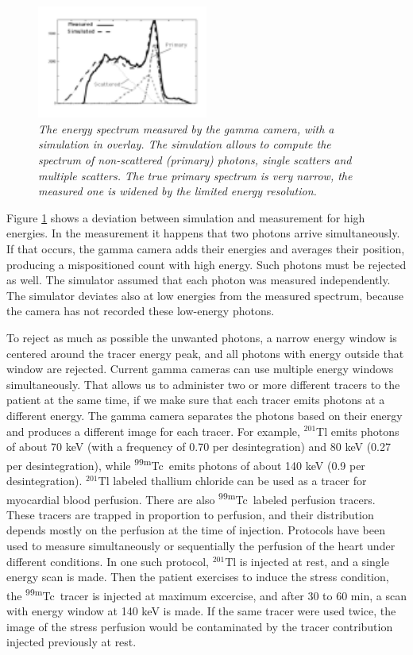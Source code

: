 \documentclass[11pt,oneside]{article}
\begin{document}
\begin{figure}[tb]
\centering
\includegraphics[width=0.5\textwidth]{figs/fig_scatter_spectrum.pdf}
\caption{\label{fig:scatter_spectrum} \emph{The energy spectrum measured by
the gamma camera, with a simulation in overlay. The simulation allows to
compute the spectrum of non-scattered (primary) photons, single scatters and
multiple scatters. The true primary spectrum is very narrow, the measured one
is widened by the limited energy resolution.}}
\end{figure}

Figure \ref{fig:scatter_spectrum} shows a deviation between simulation and
measurement for high energies. In the measurement it happens that two photons
arrive simultaneously. If that occurs, the gamma camera adds their energies
and averages their position, producing a mispositioned count with high
energy. Such photons must be rejected as well. The simulator assumed
that each photon was measured independently. The simulator deviates also at
low energies from the measured spectrum, because the camera has not recorded
these low-energy photons.

To reject as much as possible the unwanted photons, a narrow energy
window is centered around the tracer energy peak, and all photons with
energy outside that window are rejected. Current gamma cameras can use
multiple energy windows simultaneously. That allows us to administer
two or more different tracers to the patient at the same time, if we
make sure that each tracer emits photons at a different energy. The
gamma camera separates the photons based on their energy and produces
a different image for each tracer. For example, $^{201}$Tl emits
photons of about 70 keV (with a frequency of 0.70 per desintegration)
and 80 keV (0.27 per desintegration), while \textsuperscript{99m}Tc\ emits photons
of about 140 keV (0.9 per desintegration). $^{201}$Tl labeled thallium
chloride can be used as a tracer for myocardial blood perfusion. There
are also \textsuperscript{99m}Tc\ labeled perfusion tracers. These tracers are
trapped in proportion to perfusion, and their distribution depends
mostly on the perfusion at the time of injection.  Protocols have been
used to measure simultaneously or sequentially the perfusion of the
heart under different conditions. In one such protocol, $^{201}$Tl is
injected at rest, and a single energy scan is made. Then the patient
exercises to induce the stress condition, the \textsuperscript{99m}Tc\ tracer is
injected at maximum excercise, and after 30 to 60 min, a scan with
energy window at 140 keV is made. If the same tracer were used twice,
the image of the stress perfusion would be contaminated by the tracer
contribution injected previously at rest.
\end{document}
